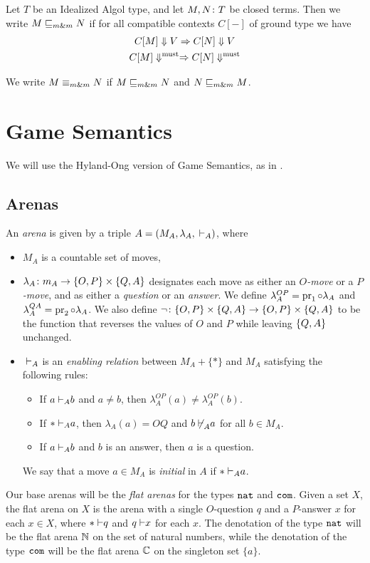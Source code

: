 \documentclass[sigplan,10pt,review]{acmart}\settopmatter{printfolios=true,printccs=false,printacmref=false}
\begin{document}
Let $T$ be an Idealized Algol type, and let $M,N\colon T$ be closed terms.
Then we write $M\sqsubseteq_{m\&m} N$ if for all compatible contexts $C[-]$ of ground type we have
\begin{gather*}
  C[M]\Downarrow V \Rightarrow C[N] \Downarrow V\\
  C[M]\Downarrow^{\text{must}} \Rightarrow C[N] \Downarrow^{\text{must}}
\end{gather*}

We write $M\equiv_{m\&m} N$ if $M\sqsubseteq_{m\&m} N$ and $N\sqsubseteq_{m\&m} M$.

\section{Game Semantics}

We will use the Hyland-Ong version of Game Semantics, as in \cite{SamsonGuyIAPassive}.

\subsection{Arenas}

An \emph{arena} is given by a triple $A=(M_A,\lambda_A,{\;\vdash}_A)$, where
\begin{itemize}
  \item $M_A$ is a countable set of moves,
  \item $\lambda_A\colon m_A\to\{O,P\}\times\{Q,A\}$ designates each move as either an \emph{$O$-move} or a \emph{$P$-move}, and as either a \emph{question} or an \emph{answer}.  
    We define $\lambda_A^{OP}=\operatorname{pr}_1\circ\lambda_A$ and $\lambda_A^{QA}=\operatorname{pr}_2\circ\lambda_A$.  
    We also define $\neg\colon\{O,P\}\times\{Q,A\}\to\{O,P\}\times\{Q,A\}$ to be the function that reverses the values of $O$ and $P$ while leaving $\{Q,A\}$ unchanged.
  \item ${\;\vdash}_A$ is an \emph{enabling relation} between $M_A+\{*\}$ and $M_A$ satisfying the following rules:
    \begin{itemize}
      \item If $a{\;\vdash}_A b$ and $a\ne b$, then $\lambda_A^{OP}(a)\neq\lambda_A^{OP}(b)$.  
      \item If $*{\;\vdash}_A a$, then $\lambda_A(a)=OQ$ and $b{\;\not\vdash}_A a$ for all $b\in M_A$.
      \item If $a{\;\vdash}_A b$ and $b$ is an answer, then $a$ is a question.
    \end{itemize}
    We say that a move $a\in M_A$ is \emph{initial} in $A$ if $*{\;\vdash}_A a$.
\end{itemize}

Our base arenas will be the \emph{flat arenas} for the types ${\mathtt{nat}}$ and ${\mathtt{com}}$.  
Given a set $X$, the flat arena on $X$ is the arena with a single $O$-question $q$ and a $P$-answer $x$ for each $x\in X$, where $*{\;\vdash} q$ and $q{\;\vdash} x$ for each $x$.  
The denotation of the type ${\mathtt{nat}}$ will be the flat arena $\mathbb{N}$ on the set of natural numbers, while the denotation of the type ${\mathtt{com}}$ will be the flat arena $\mathbb{C}$ on the singleton set $\{a\}$.
\end{document}
